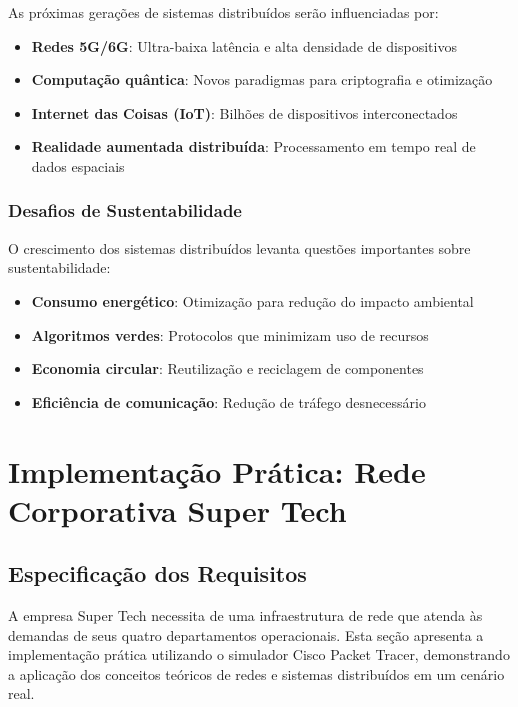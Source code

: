 As próximas gerações de sistemas distribuídos serão influenciadas por:

\begin{itemize}
    \item \textbf{Redes 5G/6G}: Ultra-baixa latência e alta densidade de dispositivos
    \item \textbf{Computação quântica}: Novos paradigmas para criptografia e otimização
    \item \textbf{Internet das Coisas (IoT)}: Bilhões de dispositivos interconectados
    \item \textbf{Realidade aumentada distribuída}: Processamento em tempo real de dados espaciais
\end{itemize}

\subsubsection{Desafios de Sustentabilidade}

O crescimento dos sistemas distribuídos levanta questões importantes sobre sustentabilidade:

\begin{itemize}
    \item \textbf{Consumo energético}: Otimização para redução do impacto ambiental
    \item \textbf{Algoritmos verdes}: Protocolos que minimizam uso de recursos
    \item \textbf{Economia circular}: Reutilização e reciclagem de componentes
    \item \textbf{Eficiência de comunicação}: Redução de tráfego desnecessário
\end{itemize}

\section{Implementação Prática: Rede Corporativa Super Tech}

\subsection{Especificação dos Requisitos}

A empresa Super Tech necessita de uma infraestrutura de rede que atenda às demandas de seus quatro departamentos operacionais. Esta seção apresenta a implementação prática utilizando o simulador Cisco Packet Tracer, demonstrando a aplicação dos conceitos teóricos de redes e sistemas distribuídos em um cenário real.

